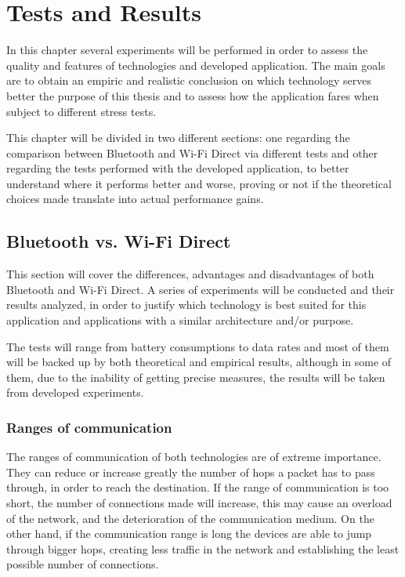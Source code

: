 \chapter{Tests and Results}
\label{tests}

In this chapter several experiments will be performed in order to assess the quality and features of technologies and developed application. The main goals are to obtain an empiric and realistic conclusion on which technology serves better the purpose of this thesis and to assess how the application fares when subject to different stress tests.

This chapter will be divided in two different sections: one regarding the comparison between Bluetooth and Wi-Fi Direct via different tests and other regarding the tests performed with the developed application, to better understand where it performs better and worse, proving or not if the theoretical choices made translate into actual performance gains.

\section{Bluetooth vs. Wi-Fi Direct}

This section will cover the differences, advantages and disadvantages of both Bluetooth and Wi-Fi Direct. A series of experiments will be conducted and their results analyzed, in order to justify which technology is best suited for this application and applications with a similar architecture and/or purpose.

The tests will range from battery consumptions to data rates and most of them will be backed up by both theoretical and empirical results, although in some of them, due to the inability of getting precise measures, the results will be taken from developed experiments.

\subsection{Ranges of communication}

The ranges of communication of both technologies are of extreme importance. They can reduce or increase greatly the number of hops a packet has to pass through, in order to reach the destination. If the range of communication is too short, the number of connections made will increase, this may cause an overload of the network, and the deterioration of the communication medium. On the other hand, if the communication range is long the devices are able to jump through bigger hops, creating less traffic in the network and establishing the least possible number of connections.

